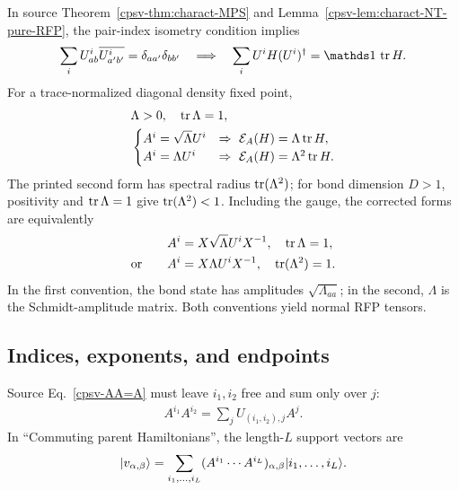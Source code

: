 \documentclass[aps,pra,reprint,nofootinbib,onecolumn]{revtex4-2}
\begin{document}
In source Theorem~\ref{cpsv-thm:charact-MPS} and
Lemma~\ref{cpsv-lem:charact-NT-pure-RFP}, the pair-index isometry
condition implies
\begin{align}
	\sum_iU^i_{ab}\overline{U^i_{a'b'}}
	=\delta_{aa'}\delta_{bb'}
	\quad\Longrightarrow\quad
	\sum_iU^iH(U^i)^\dagger=\Id\,\tr H.
	\label{eq:isometry-trace}
\end{align}
For a trace-normalized diagonal density fixed point,
\begin{align}
	 & \Lambda>0,\quad\operatorname{tr}\Lambda=1,\nonumber       \\
	 & \begin{cases}
		   A^i=\sqrt\Lambda U^i
		    & \Rightarrow\ \mathcal{E}_A(H)=\Lambda\operatorname{tr} H,   \\
		   A^i=\Lambda U^i
		    & \Rightarrow\ \mathcal{E}_A(H)=\Lambda^2\operatorname{tr} H.
	   \end{cases}
	\label{eq:sqrt-comparison}
\end{align}
The printed second form has spectral radius $\operatorname{tr}(\Lambda^2)$;
for bond dimension $D>1$, positivity and $\operatorname{tr}\Lambda=1$ give
$\operatorname{tr}(\Lambda^2)<1$. Including the gauge, the corrected forms are equivalently
\begin{align}
	A^i & =X\sqrt\Lambda U^iX^{-1},\quad\operatorname{tr}\Lambda=1,\nonumber \\
	\text{or}\qquad
	A^i & =X\Lambda U^iX^{-1},\quad\operatorname{tr}(\Lambda^2)=1.
	\label{eq:sqrt-corrected}
\end{align}
In the first convention, the bond state has amplitudes
$\sqrt{\Lambda_{aa}}$; in the second, $\Lambda$ is the
Schmidt-amplitude matrix. Both conventions yield normal RFP tensors.

\subsection{Indices, exponents, and endpoints}

Source Eq.~\eqref{cpsv-AA=A} must leave $i_1,i_2$ free and sum
only over $j$:
\begin{align}
	A^{i_1}A^{i_2}=\sum_jU_{(i_1,i_2),j}A^j.
	\label{eq:corrected-AA=A}
\end{align}
In ``Commuting parent Hamiltonians'', the length-$L$ support
vectors are
\begin{align}
	\lvert v_{\alpha,\beta}\rangle
	=\sum_{i_1,\ldots,i_L}
	 (A^{i_1}\cdots A^{i_L})_{\alpha,\beta}
	\lvert i_1,\ldots,i_L\rangle.
	\label{eq:corrected-parent-support}
\end{align}
\end{document}
